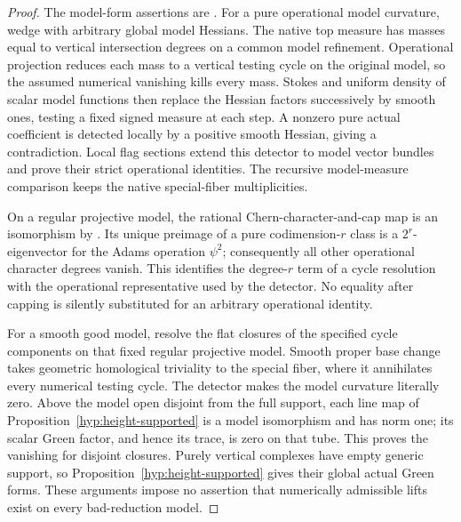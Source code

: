 \documentclass[11pt,a4paper]{article}
\theoremstyle{definition}
\theoremstyle{remark}
\numberwithin{equation}{section}
\begin{document}
\begin{proof}
The model-form assertions are \cite[Theorems \texttt{r10c:numerical-zero} and \texttt{r10c:chern}]{GC}. For a pure operational model curvature, wedge with arbitrary global model Hessians. The native top measure has masses equal to vertical intersection degrees on a common model refinement. Operational projection reduces each mass to a vertical testing cycle on the original model, so the assumed numerical vanishing kills every mass. Stokes and uniform density of scalar model functions then replace the Hessian factors successively by smooth ones, testing a fixed signed measure at each step. A nonzero pure actual coefficient is detected locally by a positive smooth Hessian, giving a contradiction. Local flag sections extend this detector to model vector bundles and prove their strict operational identities. The recursive model-measure comparison keeps the native special-fiber multiplicities.

On a regular projective model, the rational Chern-character-and-cap map is an isomorphism by \cite[Lemma 42.58.1, Tag 0FEX]{Stacks}. Its unique preimage of a pure codimension-$r$ class is a $2^r$-eigenvector for the Adams operation $\psi^2$; consequently all other operational character degrees vanish. This identifies the degree-$r$ term of a cycle resolution with the operational representative used by the detector. No equality after capping is silently substituted for an arbitrary operational identity.

For a smooth good model, resolve the flat closures of the specified cycle components on that fixed regular projective model. Smooth proper base change takes geometric homological triviality to the special fiber, where it annihilates every numerical testing cycle. The detector makes the model curvature literally zero. Above the model open disjoint from the full support, each line map of Proposition~\ref{hyp:height-supported} is a model isomorphism and has norm one; its scalar Green factor, and hence its trace, is zero on that tube. This proves the vanishing for disjoint closures. Purely vertical complexes have empty generic support, so Proposition~\ref{hyp:height-supported} gives their global actual Green forms. These arguments impose no assertion that numerically admissible lifts exist on every bad-reduction model.
\end{proof}
\end{document}
